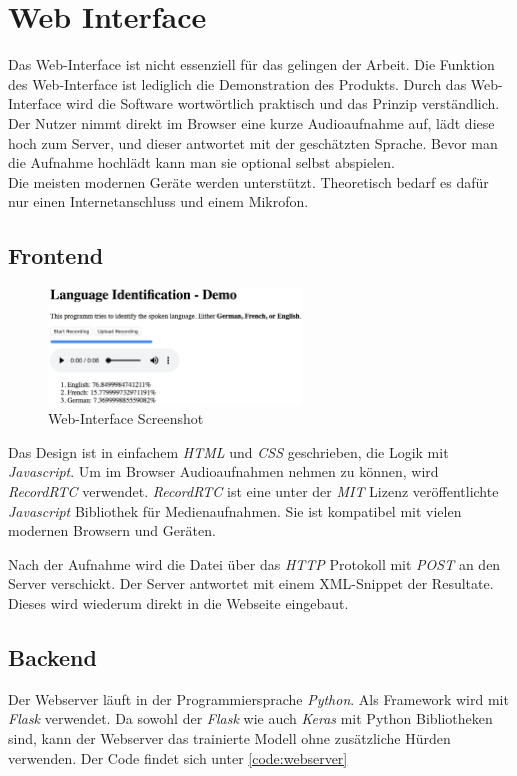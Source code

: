 \section{Web Interface}
Das Web-Interface ist nicht essenziell für das gelingen der Arbeit. Die Funktion des Web-Interface ist lediglich die Demonstration des Produkts. Durch das Web-Interface wird die Software wortwörtlich praktisch und das Prinzip verständlich. Der Nutzer nimmt direkt im Browser eine kurze Audioaufnahme auf, lädt diese hoch zum Server, und dieser antwortet mit der geschätzten Sprache. Bevor man die Aufnahme hochlädt kann man sie optional selbst abspielen.
\\
Die meisten modernen Geräte werden unterstützt. Theoretisch bedarf es dafür nur einen Internetanschluss und einem Mikrofon. 


\subsection{Frontend}
\begin{figure}[hbt]
	\centering
		\includegraphics[width=0.6\textwidth]{assets/interface.png}
	\caption{Web-Interface Screenshot}
	\label{img:interface}
\end{figure}
Das Design ist in einfachem \textit{HTML} und \textit{CSS} geschrieben, die Logik mit \textit{Javascript}. Um im Browser Audioaufnahmen nehmen zu können, wird \textit{RecordRTC}\cite{recordrtc} verwendet. \textit{RecordRTC} ist eine unter der \textit{MIT} Lizenz veröffentlichte \textit{Javascript} Bibliothek für Medienaufnahmen. Sie ist kompatibel mit vielen modernen Browsern und Geräten.

Nach der Aufnahme wird die Datei über das \textit{HTTP} Protokoll mit \textit{POST} an den Server verschickt. Der Server antwortet mit einem XML-Snippet der Resultate.
Dieses wird wiederum direkt in die Webseite eingebaut.


\subsection{Backend}
Der Webserver läuft in der Programmiersprache \textit{Python}. Als Framework wird mit \textit{Flask}\cite{flask} verwendet. Da sowohl der \textit{Flask} wie auch \textit{Keras} mit Python Bibliotheken sind, kann der Webserver das trainierte Modell ohne zusätzliche Hürden verwenden.
Der Code findet sich unter \ref{code:webserver}
